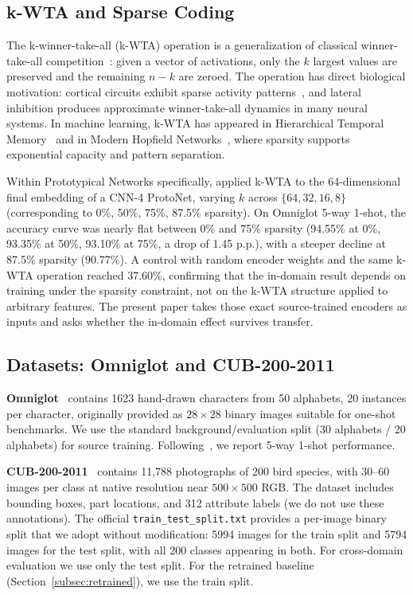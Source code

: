 \documentclass[11pt]{article}
\begin{document}
\subsection{k-WTA and Sparse Coding}

The k-winner-take-all (k-WTA) operation is a generalization of classical winner-take-all competition~\citep{maass2000computational}: given a vector of activations, only the $k$ largest values are preserved and the remaining $n-k$ are zeroed. The operation has direct biological motivation: cortical circuits exhibit sparse activity patterns~\citep{olshausen1996emergence}, and lateral inhibition produces approximate winner-take-all dynamics in many neural systems. In machine learning, k-WTA has appeared in Hierarchical Temporal Memory~\citep{ahmad2019dense} and in Modern Hopfield Networks~\citep{ramsauer2021hopfield}, where sparsity supports exponential capacity and pattern separation.

Within Prototypical Networks specifically, \citet{pinho2026kwta} applied k-WTA to the 64-dimensional final embedding of a CNN-4 ProtoNet, varying $k$ across $\{64, 32, 16, 8\}$ (corresponding to 0\%, 50\%, 75\%, 87.5\% sparsity). On Omniglot 5-way 1-shot, the accuracy curve was nearly flat between 0\% and 75\% sparsity (94.55\% at 0\%, 93.35\% at 50\%, 93.10\% at 75\%, a drop of 1.45 p.p.), with a steeper decline at 87.5\% sparsity (90.77\%). A control with random encoder weights and the same k-WTA operation reached 37.60\%, confirming that the in-domain result depends on training under the sparsity constraint, not on the k-WTA structure applied to arbitrary features. The present paper takes those exact source-trained encoders as inputs and asks whether the in-domain effect survives transfer.

\subsection{Datasets: Omniglot and CUB-200-2011}

\textbf{Omniglot}~\citep{lake2015human} contains 1623 hand-drawn characters from 50 alphabets, 20 instances per character, originally provided as $28 \times 28$ binary images suitable for one-shot benchmarks. We use the standard background/evaluation split (30 alphabets / 20 alphabets) for source training. Following~\citet{pinho2026kwta}, we report 5-way 1-shot performance.

\textbf{CUB-200-2011}~\citep{wah2011caltech} contains 11{,}788 photographs of 200 bird species, with 30--60 images per class at native resolution near $500 \times 500$ RGB. The dataset includes bounding boxes, part locations, and 312 attribute labels (we do not use these annotations). The official \texttt{train\_test\_split.txt} provides a per-image binary split that we adopt without modification: 5994 images for the train split and 5794 images for the test split, with all 200 classes appearing in both. For cross-domain evaluation we use only the test split. For the retrained baseline (Section~\ref{subsec:retrained}), we use the train split.
\end{document}
